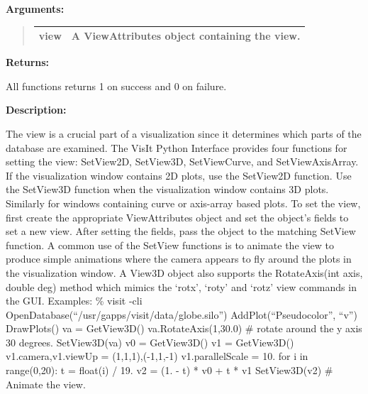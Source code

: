 \documentclass[letterpaper,10pt,english]{sphinxmanual}
\begin{document}
\begin{DUlineblock}{0em}
\item[] 
\item[] \textbf{Arguments:}
\end{DUlineblock}
\begin{quote}

\begin{tabulary}{\linewidth}{|L|L|}
\hline

view
 & 
A ViewAttributes object containing the view.
\\
\hline\end{tabulary}

\end{quote}

\begin{DUlineblock}{0em}
\item[] 
\item[] \textbf{Returns:}
\item[] All functions returns 1 on success and 0 on failure.
\item[] 
\item[] \textbf{Description:}
\item[] The view is a crucial part of a visualization since it determines
which parts of the database are examined. The VisIt Python Interface
provides four functions for setting the view: SetView2D, SetView3D,
SetViewCurve, and SetViewAxisArray. If the visualization window
contains 2D plots, use the SetView2D function. Use the SetView3D
function when the visualization window contains 3D plots.  Similarly
for windows containing curve or axis-array based plots.  To set the
view, first create the appropriate ViewAttributes object and set the
object's fields to set a new view. After setting the fields, pass the
object to the matching SetView function. A common use of the SetView
functions is to animate the view to produce simple animations where
the camera appears to fly around the plots in the visualization
window.
A View3D object also supports the RotateAxis(int axis, double deg)
method which mimics the `rotx', `roty' and `rotz' view commands in
the GUI.
Examples:
\% visit -cli
OpenDatabase(``/usr/gapps/visit/data/globe.silo'')
AddPlot(``Pseudocolor'', ``v'')
DrawPlots()
va = GetView3D()
va.RotateAxis(1,30.0) \# rotate around the y axis 30 degrees.
SetView3D(va)
v0 = GetView3D()
v1 = GetView3D()
v1.camera,v1.viewUp = (1,1,1),(-1,1,-1)
v1.parallelScale = 10.
for i in range(0,20):
t = float(i) / 19.
v2 = (1. - t) * v0 + t * v1
SetView3D(v2) \# Animate the view.
\end{DUlineblock}
\end{document}
